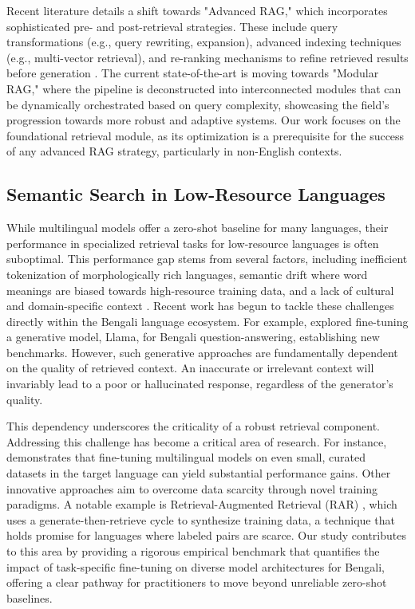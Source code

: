 \documentclass[acmsmall,screen,review]{acmart}
\begin{document}
Recent literature details a shift towards "Advanced RAG," which incorporates sophisticated pre- and post-retrieval strategies. These include query transformations (e.g., query rewriting, expansion), advanced indexing techniques (e.g., multi-vector retrieval), and re-ranking mechanisms to refine retrieved results before generation \cite{gao2023survey}. The current state-of-the-art is moving towards "Modular RAG," where the pipeline is deconstructed into interconnected modules that can be dynamically orchestrated based on query complexity, showcasing the field's progression towards more robust and adaptive systems. Our work focuses on the foundational retrieval module, as its optimization is a prerequisite for the success of any advanced RAG strategy, particularly in non-English contexts.

\subsection{Semantic Search in Low-Resource Languages}
While multilingual models offer a zero-shot baseline for many languages, their performance in specialized retrieval tasks for low-resource languages is often suboptimal. This performance gap stems from several factors, including inefficient tokenization of morphologically rich languages, semantic drift where word meanings are biased towards high-resource training data, and a lack of cultural and domain-specific context \cite{lin2024improving}. Recent work has begun to tackle these challenges directly within the Bengali language ecosystem. For example, \cite{debanath2025advancing} explored fine-tuning a generative model, Llama, for Bengali question-answering, establishing new benchmarks. However, such generative approaches are fundamentally dependent on the quality of retrieved context. An inaccurate or irrelevant context will invariably lead to a poor or hallucinated response, regardless of the generator's quality.

This dependency underscores the criticality of a robust retrieval component. Addressing this challenge has become a critical area of research. For instance, \cite{lin2024improving} demonstrates that fine-tuning multilingual models on even small, curated datasets in the target language can yield substantial performance gains. Other innovative approaches aim to overcome data scarcity through novel training paradigms. A notable example is Retrieval-Augmented Retrieval (RAR) \cite{yasunaga2022retrieval}, which uses a generate-then-retrieve cycle to synthesize training data, a technique that holds promise for languages where labeled pairs are scarce. Our study contributes to this area by providing a rigorous empirical benchmark that quantifies the impact of task-specific fine-tuning on diverse model architectures for Bengali, offering a clear pathway for practitioners to move beyond unreliable zero-shot baselines.
\end{document}
